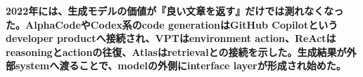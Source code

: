 \noindent\textbf{2022年には、生成モデルの価値が『良い文章を返す』だけでは測れなくなった。AlphaCodeやCodex系のcode generationはGitHub Copilotというdeveloper productへ接続され、VPTはenvironment action、ReActはreasoningとactionの往復、Atlasはretrievalとの接続を示した。生成結果が外部systemへ渡ることで、modelの外側にinterface layerが形成され始めた。}\autocite{src-4e33c3e8216e,src-811e1008822e,src-8170b5e4c279,src-b1418e7ae779,src-d117f3860a91,src-dc0d76e03fc6}
